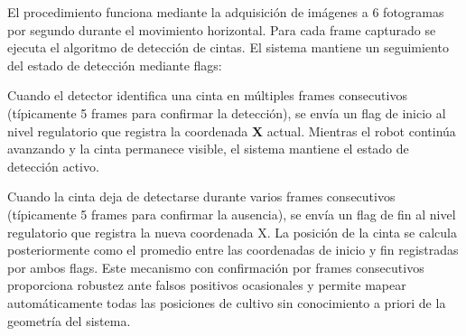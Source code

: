 El procedimiento funciona mediante la adquisición de imágenes a 6 fotogramas por segundo durante el movimiento horizontal. Para cada frame capturado se ejecuta el algoritmo de detección de cintas. El sistema mantiene un seguimiento del estado de detección mediante flags:

Cuando el detector identifica una cinta en múltiples frames consecutivos (típicamente 5 frames para confirmar la detección), se envía un flag de inicio al nivel regulatorio que registra la coordenada \textbf{X} actual. Mientras el robot continúa avanzando y la cinta permanece visible, el sistema mantiene el estado de detección activo.

Cuando la cinta deja de detectarse durante varios frames consecutivos (típicamente 5 frames para confirmar la ausencia), se envía un flag de fin al nivel regulatorio que registra la nueva coordenada X. La posición de la cinta se calcula posteriormente como el promedio entre las coordenadas de inicio y fin registradas por ambos flags. Este mecanismo con confirmación por frames consecutivos proporciona robustez ante falsos positivos ocasionales y permite mapear automáticamente todas las posiciones de cultivo sin conocimiento a priori de la geometría del sistema.
